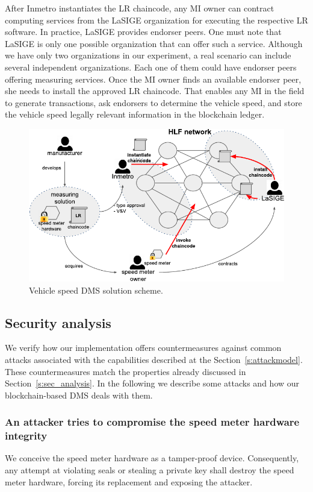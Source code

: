 \documentclass[journal]{IEEEtran}
\begin{document}
After Inmetro instantiates the LR chaincode, any MI owner can contract computing services from the LaSIGE organization for executing the respective LR software.
In practice, LaSIGE provides endorser peers.
One must note that LaSIGE is only one possible organization that can offer such a service.
Although we have only two organizations in our experiment, a real scenario can include several independent organizations.
Each one of them could have endorser peers offering measuring services.
Once the MI owner finds an available endorser peer, she needs to install the approved LR chaincode.
That enables any MI in the field to generate transactions, ask endorsers to determine the vehicle speed, and store the vehicle speed legally relevant information in the blockchain ledger.

\begin{figure}[!t]
\centering
\includegraphics[width=.45\textwidth]{hlfscheme} %
\caption{Vehicle speed DMS solution scheme.}
\label{f:scheme}
\end{figure}

\subsection{Security analysis}
We verify how our implementation offers countermeasures against common attacks associated with the capabilities described at the Section~\ref{s:attackmodel}.
These countermeasures match the properties already discussed in Section~\ref{s:sec_analysis}.
In the following we describe some attacks and how our blockchain-based DMS deals with them.

\subsubsection{An attacker tries to compromise the speed meter hardware integrity}
We conceive the speed meter hardware as a tamper-proof device.
Consequently, any attempt at violating seals or stealing a private key shall destroy the speed meter hardware, forcing its replacement and exposing the attacker.
\end{document}
